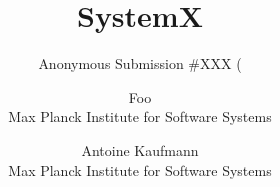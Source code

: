 \documentclass[a4paper,twocolumn,10pt]{article}
\newcommand{\sys}{SystemX\xspace}
\newcommand{\sys}{MySystem\xspace}
\begin{document}
\date{}
\title{\sys}

\if {}
  \author{Anonymous Submission \#XXX (\pageref{page:last pages}}
\else
  \author{
    Foo\\
    Max Planck Institute for Software Systems
    \and
    Antoine Kaufmann\\
    Max Planck Institute for Software Systems
    }
\fi

\maketitle










\if {}

\fi





\label{page:last}
\end{document}
